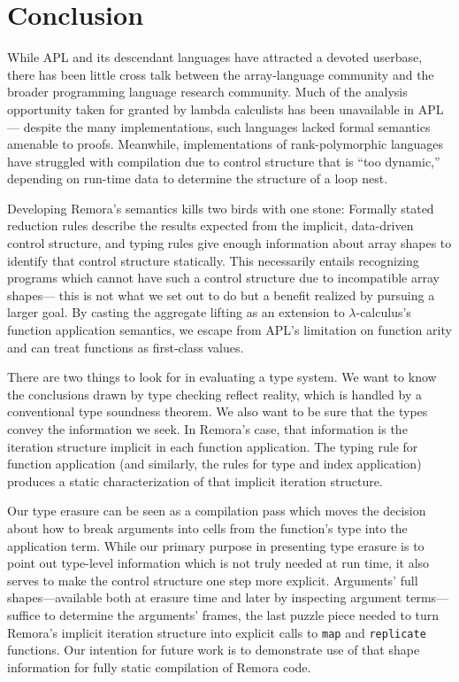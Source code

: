 \section{Conclusion}

While APL and its descendant languages have attracted a devoted userbase,
there has been little cross talk between
the array-language community and
the broader programming language research community.
Much of the analysis opportunity taken for granted by lambda calculists
has been unavailable in APL---%
despite the many implementations,
such languages lacked formal semantics amenable to proofs.
Meanwhile, implementations of rank-polymorphic languages
have struggled with compilation due to control structure that is ``too dynamic,''
depending on run-time data to determine the structure of a loop nest.

Developing Remora's semantics kills two birds with one stone:
Formally stated reduction rules describe
the results expected from the implicit, data-driven control structure,
and typing rules give enough information about array shapes
to identify that control structure statically.
This necessarily entails recognizing programs
which cannot have such a control structure
due to incompatible array shapes---%
this is not what we set out to do
but a benefit realized by pursuing a larger goal.
By casting the aggregate lifting as an extension to
$\lambda$-calculus's function application semantics,
we escape from APL's limitation on function arity
and can treat functions as first-class values.

There are two things to look for in evaluating a type system.
We want to know the conclusions drawn by type checking reflect reality,
which is handled by a conventional type soundness theorem.
We also want to be sure that the types convey the information we seek.
In Remora's case, that information is
the iteration structure implicit in each function application.
The typing rule for function application
(and similarly, the rules for type and index application)
produces a static characterization of that implicit iteration structure.

Our type erasure can be seen as a compilation pass
which moves the decision about how to break arguments into cells
from the function's type into the application term.
While our primary purpose in presenting type erasure
is to point out type-level information which is not truly needed at run time,
it also serves to make the control structure one step more explicit.
Arguments' full shapes---available both at erasure time
and later by inspecting argument terms---%
suffice to determine the arguments' frames,
the last puzzle piece needed to turn
Remora's implicit iteration structure into
explicit calls to {\tt map} and {\tt replicate} functions.
Our intention for future work is to
demonstrate use of that shape information for
fully static compilation of Remora code.